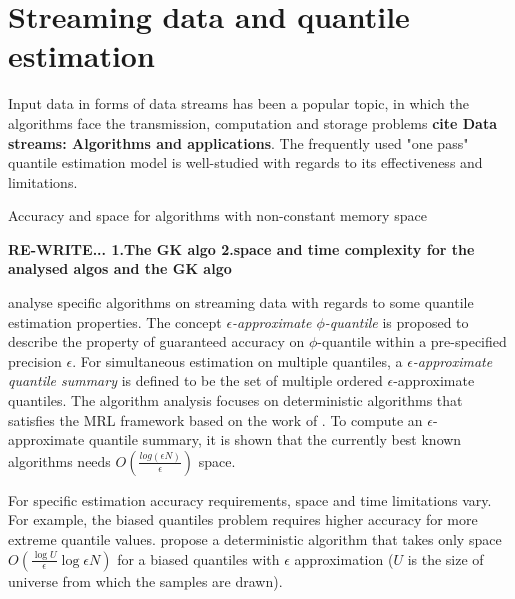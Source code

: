 \documentclass[12pt]{article}
\begin{document}
    \section{Streaming data and quantile estimation}
    Input data in forms of data streams has been a popular topic, in which the algorithms face the transmission, computation and storage problems \textbf{cite  Data streams: Algorithms and applications}. The frequently used "one pass" quantile estimation model is well-studied with regards to its effectiveness and limitations.

    Accuracy and space for algorithms with non-constant memory space\cite{greenwaldQuantilesEquidepthHistograms2016a}

    \textbf{RE-WRITE... 1.The GK algo 2.space and time complexity for the analysed algos and the GK algo} 

    \citeauthor{greenwaldQuantilesEquidepthHistograms2016a}\cite{greenwaldQuantilesEquidepthHistograms2016a} analyse specific algorithms on streaming data with regards to some quantile estimation properties. The concept \textit{$\epsilon$-approximate $\phi$-quantile} is proposed to describe the property of guaranteed accuracy on $\phi$-quantile within a pre-specified precision $\epsilon$. For simultaneous estimation on multiple quantiles, a \textit{$\epsilon$-approximate quantile summary} is defined to be the set of multiple ordered $\epsilon$-approximate quantiles.
    The algorithm analysis focuses on deterministic algorithms that satisfies the MRL framework based on the work of \citeauthor{mankuApproximateMediansOther} \cite{mankuApproximateMediansOther}. To compute an $\epsilon$-approximate quantile summary, it is shown that the currently best known algorithms needs $O(\frac{log(\epsilon N)} {\epsilon})$ space.

    For specific estimation accuracy requirements, space and time limitations vary. For example, the biased quantiles problem requires higher accuracy for more extreme quantile values. \citeauthor{cormodeSpaceTimeefficientDeterministic2006} \cite{cormodeSpaceTimeefficientDeterministic2006} propose a deterministic algorithm that takes only space $O(\frac{\log {U}}{\epsilon} \log {\epsilon N})$ for a biased quantiles with $\epsilon$ approximation ($U$ is the size of universe from which the samples are drawn). 
\end{document}
